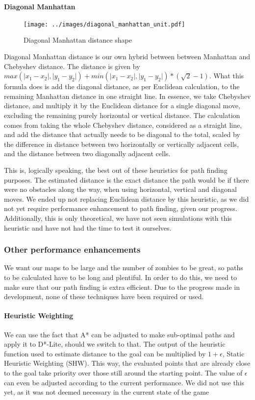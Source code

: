 \paragraph{Diagonal Manhattan}
\begin{wrapfigure}{r}{0.30\textwidth}
\texttt{[image: ../images/diagonal\_manhattan\_unit.pdf]}
\caption{Diagonal Manhattan distance shape}
\end{wrapfigure}
Diagonal Manhattan distance is our own hybrid between between Manhattan and Chebyshev distance. The distance is given by $max(\lvert x_1 - x_2 \rvert, \lvert y_1 - y_2 \rvert) + min(\lvert x_1 - x_2 \rvert, \lvert y_1 - y_2 \rvert) * (\sqrt{2} - 1)$. What this formula does is add the diagonal distance, as per Euclidean calculation, to the remaining Manhattan distance in one straight line. In essence, we take Chebyshev distance, and multiply it by the Euclidean distance for a single diagonal move, excluding the remaining purely horizontal or vertical distance. The calculation comes from taking the whole Chebyshev distance, considered as a straight line, and add the distance that actually needs to be diagonal to the total, scaled by the difference in distance between two horizontally or vertically adjacent cells, and the distance between two diagonally adjacent cells.

This is, logically speaking, the best out of these heuristics for path finding purposes. The estimated distance is the exact distance the path would be if there were no obstacles along the way, when using horizontal, vertical and diagonal moves. We ended up not replacing Euclidean distance by this heuristic, as we did not yet require performance enhancement to path finding, given our progress. Additionally, this is only theoretical, we have not seen simulations with this heuristic and have not had the time to test it ourselves.

\subsubsection{Other performance enhancements}
We want our maps to be large and the number of zombies to be great, so paths to be calculated have to be long and plentiful. In order to do this, we need to make sure that our path finding is extra efficient. Due to the progress made in development, none of these techniques have been required or used. 

\paragraph{Heuristic Weighting}
We can use the fact that A* can be adjusted to make sub-optimal paths and apply it to D*-Lite, should we switch to that. The output of the heuristic function used to estimate distance to the goal can be multiplied by $1 + \epsilon$, Static Heuristic Weighting (SHW). This way, the evaluated points that are already close to the goal take priority over those still around the starting point. The value of $\epsilon$ can even be adjusted according to the current performance. We did not use this yet, as it was not deemed necessary in the current state of the game

